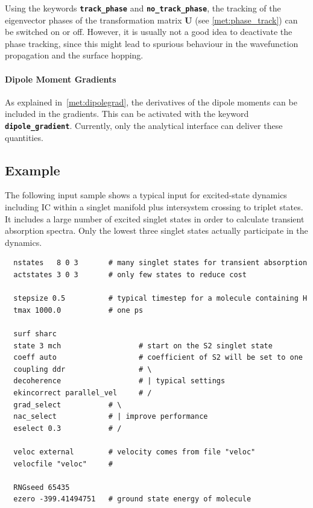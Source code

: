 \documentclass[a4paper,11pt,DIV=15,openany,twoside=false]{scrbook}
\newcommand{\ttt}[1]{\textbf{\texttt{#1}}}
\newenvironment{example}{
  \vspace{0mm}
  \definecolor{shadecolor}{HTML}{BBDDFF}
  \begin{shaded}
  \begin{minipage}{0.9\textwidth}
}{
  \end{minipage}
  \end{shaded}
}
\begin{document}
Using the keywords \ttt{track\_phase} and \ttt{no\_track\_phase}, the tracking of the eigenvector phases of the transformation matrix $\mathbf{U}$ (see \ref{met:phase_track}) can be switched on or off. However, it is usually not a good idea to deactivate the phase tracking, since this might lead to spurious behaviour in the wavefunction propagation and the surface hopping.

\paragraph{Dipole Moment Gradients}

As explained in~\ref{met:dipolegrad}, the derivatives of the dipole moments can be included in the gradients. This can be activated with the keyword \ttt{dipole\_gradient}. Currently, only the analytical interface can deliver these quantities.




\subsection{Example}

The following input sample shows a typical input for excited-state dynamics including IC within a singlet manifold plus intersystem crossing to triplet states. It includes a large number of excited singlet states in order to calculate transient absorption spectra. Only the lowest three singlet states actually participate in the dynamics. 

\begin{example}
  \begin{verbatim}
  nstates   8 0 3       # many singlet states for transient absorption
  actstates 3 0 3       # only few states to reduce cost

  stepsize 0.5          # typical timestep for a molecule containing H
  tmax 1000.0           # one ps

  surf sharc
  state 3 mch                  # start on the S2 singlet state
  coeff auto                   # coefficient of S2 will be set to one
  coupling ddr                 # \
  decoherence                  # | typical settings
  ekincorrect parallel_vel     # /
  grad_select           # \
  nac_select            # | improve performance
  eselect 0.3           # /

  veloc external        # velocity comes from file "veloc"
  velocfile "veloc"     #

  RNGseed 65435
  ezero -399.41494751   # ground state energy of molecule
  \end{verbatim}
\end{example}
\end{document}
